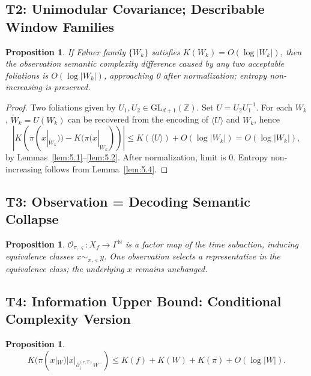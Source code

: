 \documentclass[11pt]{article}
\newtheorem{proposition}[theorem]{Proposition}
\theoremstyle{definition}
\theoremstyle{remark}
\begin{document}
\subsection{T2: Unimodular Covariance; Describable Window Families}

\begin{proposition}\label{thm:T2}
If Følner family \( \{W_k\} \) satisfies \( K(W_k) = O(\log |W_k|) \), then the observation semantic complexity difference caused by any two acceptable foliations is \( O(\log |W_k|) \), approaching 0 after normalization; entropy non-increasing is preserved.
\end{proposition}

\begin{proof}
Two foliations given by \( U_1, U_2 \in \mathrm{GL}_{d+1}(\mathbb{Z}) \). Set \( U = U_2 U_1^{-1} \). For each \( W_k \), \( \tilde{W}_k = U(W_k) \) can be recovered from the encoding of \( \langle U \rangle \) and \( W_k \), hence
\[
|K(\pi(x|_{\tilde{W}_k})) - K(\pi(x|_{W_k}))| \leq K(\langle U \rangle) + O(\log |W_k|) = O(\log |W_k|),
\]
by Lemmas~\ref{lem:5.1}--\ref{lem:5.2}. After normalization, limit is 0. Entropy non-increasing follows from Lemma~\ref{lem:5.4}.
\end{proof}

\subsection{T3: Observation = Decoding Semantic Collapse}

\begin{proposition}\label{thm:T3}
\( \mathcal{O}_{\pi, \varsigma}: X_f \to \Gamma^{\mathbb{N}} \) is a factor map of the time subaction, inducing equivalence classes \( x \sim_{\pi, \varsigma} y \). One observation selects a representative in the equivalence class; the underlying \( x \) remains unchanged.
\end{proposition}

\subsection{T4: Information Upper Bound: Conditional Complexity Version}

\begin{proposition}\label{thm:T4}
\[
\boxed{K(\pi(x|_W) | x|_{\partial_\downarrow^{(r,T)} W^-}) \leq K(f) + K(W) + K(\pi) + O(\log |W|)}.
\]
\end{proposition}
\end{document}
